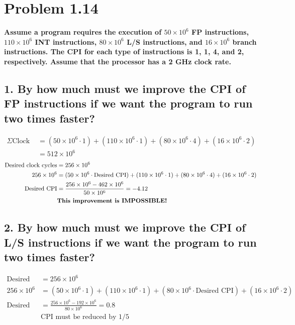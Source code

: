 \documentclass[11pt]{article}
\begin{document}
\section*{Problem 1.14}
\small\textbf{Assume a program requires the execution of $50 \times 10^6$ FP instructions, $110 \times 10^6$ INT instructions, $80 \times 10^6$ L/S instructions, and $16 \times 10^6$ branch instructions. The CPI for each type of instructions is 1, 1, 4, and 2, respectively. Assume that the processor has a 2 GHz clock rate.}

\subsection*{\small 1. By how much must we improve the CPI of FP instructions if we want the program to run two times faster?}
\begin{align*}
\Sigma \textrm{Clock Cycles} & = (50 \times 10^6 \cdot 1) + (110 \times 10^6 \cdot 1) + (80 \times 10^6 \cdot 4) + (16 \times 10^6 \cdot 2)\\
& = 512 \times 10^6
\end{align*}
\begin{align*}
\textrm{Desired clock cycles} & = 256 \times 10^6\\
256 \times 10^6 & = (50 \times 10^6 \cdot \textrm{Desired CPI}) + (110 \times 10^6 \cdot 1) + (80 \times 10^6 \cdot 4) + (16 \times 10^6 \cdot 2)\\
\textrm{Desired CPI} & = \frac{256 \times 10^6 - 462 \times 10^6}{50 \times 10^6} = {-4.12}\\
& \textbf{\textrm{This improvement is IMPOSSIBLE!}}
\end{align*}

\subsection*{\small 2. By how much must we improve the CPI of L/S instructions if we want the program to run two times faster?}
\begin{align*}
\textrm{Desired clock cycles} & = 256 \times 10^6\\
256 \times 10^6 & = (50 \times 10^6 \cdot 1) + (110 \times 10^6 \cdot 1) + (80 \times 10^6 \cdot \textrm{Desired CPI}) + (16 \times 10^6 \cdot 2)\\
\textrm{Desired CPI} & = \frac{256 \times 10^6 - 192 \times 10^6}{80 \times 10^6} = \boldsymbol{0.8}\\
& \textrm{CPI must be reduced by 1/5}
\end{align*}
\end{document}
